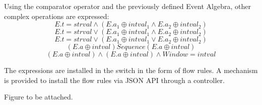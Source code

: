 \begin{flushleft}
Using the comparator operator and the previously defined Event Algebra, other complex operations are expressed:
\begin{equation}
E.t = strval \wedge (E.a_1 \oplus intval_1 \wedge E.a_2 \oplus intval_2)
\end{equation}
\begin{equation}
E.t = strval \vee (E.a_1 \oplus intval_1 \wedge E.a_2 \oplus intval_2)
\end{equation}
\begin{equation}
E.t = strval \vee (E.a_1 \oplus intval_1 \vee E.a_2 \oplus intval_2)
\end{equation}
\begin{equation}
(E.a \oplus intval) Sequence (E.a \oplus intval)
\end{equation}
\begin{equation}
(E.a \oplus intval) \wedge (E.a \oplus intval) \wedge Window = intval
\end{equation}
\end{flushleft}

\begin{flushleft}
The expressions are installed in the switch in the form of flow rules. A mechanism is provided to install the flow rules via JSON API through a controller.

Figure to be attached.
\end{flushleft}








